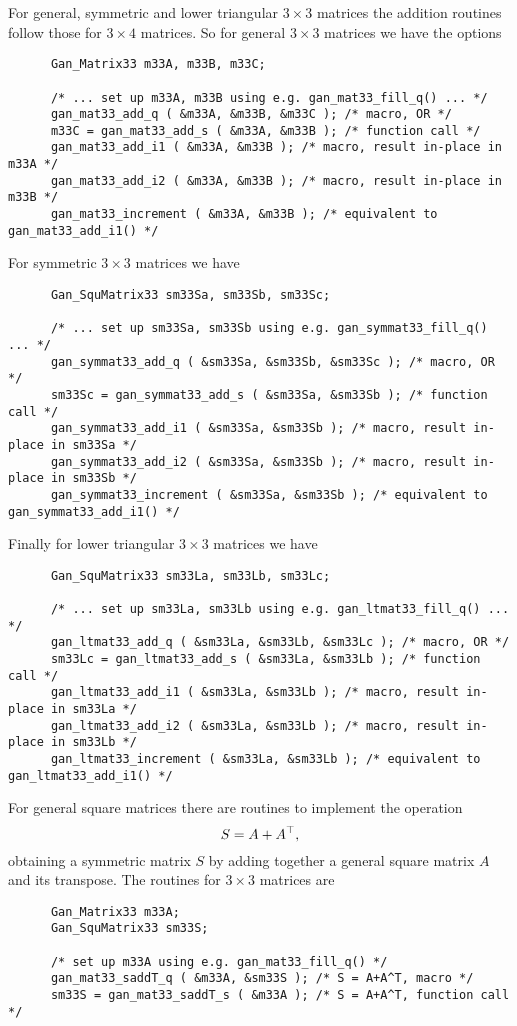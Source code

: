 For general, symmetric and lower triangular $3\times 3$ matrices the
addition routines follow those for $3\times 4$ matrices. So for general
$3\times 3$ matrices we have the options
\begin{verbatim}
      Gan_Matrix33 m33A, m33B, m33C;

      /* ... set up m33A, m33B using e.g. gan_mat33_fill_q() ... */
      gan_mat33_add_q ( &m33A, &m33B, &m33C ); /* macro, OR */
      m33C = gan_mat33_add_s ( &m33A, &m33B ); /* function call */
      gan_mat33_add_i1 ( &m33A, &m33B ); /* macro, result in-place in m33A */
      gan_mat33_add_i2 ( &m33A, &m33B ); /* macro, result in-place in m33B */
      gan_mat33_increment ( &m33A, &m33B ); /* equivalent to gan_mat33_add_i1() */
\end{verbatim}
For symmetric $3\times 3$ matrices we have
\begin{verbatim}
      Gan_SquMatrix33 sm33Sa, sm33Sb, sm33Sc;

      /* ... set up sm33Sa, sm33Sb using e.g. gan_symmat33_fill_q() ... */
      gan_symmat33_add_q ( &sm33Sa, &sm33Sb, &sm33Sc ); /* macro, OR */
      sm33Sc = gan_symmat33_add_s ( &sm33Sa, &sm33Sb ); /* function call */
      gan_symmat33_add_i1 ( &sm33Sa, &sm33Sb ); /* macro, result in-place in sm33Sa */
      gan_symmat33_add_i2 ( &sm33Sa, &sm33Sb ); /* macro, result in-place in sm33Sb */
      gan_symmat33_increment ( &sm33Sa, &sm33Sb ); /* equivalent to gan_symmat33_add_i1() */
\end{verbatim}
Finally for lower triangular $3\times 3$ matrices we have
\begin{verbatim}
      Gan_SquMatrix33 sm33La, sm33Lb, sm33Lc;

      /* ... set up sm33La, sm33Lb using e.g. gan_ltmat33_fill_q() ... */
      gan_ltmat33_add_q ( &sm33La, &sm33Lb, &sm33Lc ); /* macro, OR */
      sm33Lc = gan_ltmat33_add_s ( &sm33La, &sm33Lb ); /* function call */
      gan_ltmat33_add_i1 ( &sm33La, &sm33Lb ); /* macro, result in-place in sm33La */
      gan_ltmat33_add_i2 ( &sm33La, &sm33Lb ); /* macro, result in-place in sm33Lb */
      gan_ltmat33_increment ( &sm33La, &sm33Lb ); /* equivalent to gan_ltmat33_add_i1() */
\end{verbatim}

For general square matrices there are routines to implement the operation
\[ S = A+A^{\top},
\]
obtaining a symmetric matrix $S$ by adding together a general square matrix $A$
and its transpose. The routines for $3\times 3$ matrices are
\begin{verbatim}
      Gan_Matrix33 m33A;
      Gan_SquMatrix33 sm33S;

      /* set up m33A using e.g. gan_mat33_fill_q() */
      gan_mat33_saddT_q ( &m33A, &sm33S ); /* S = A+A^T, macro */
      sm33S = gan_mat33_saddT_s ( &m33A ); /* S = A+A^T, function call */
\end{verbatim}

